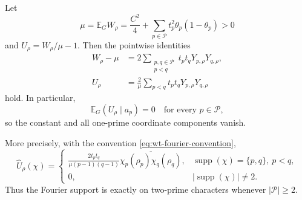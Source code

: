 \begin{theorem}
\label{thm:wt-pair-only-decomposition}
Let
\begin{equation}
 \mu=\mathbb E_G W_\rho
 =\frac{C^2}{4}
  +\sum_{p\in\mathcal P}t_p^2\theta_p(1-\theta_p)>0
 \label{eq:wt-mean-mu}
\end{equation}
and $U_\rho=W_\rho/\mu-1$.  Then the pointwise identities
\begin{align}
 W_\rho-\mu
&=2\sum_{\substack{p,q\in\mathcal P\\p<q}}
       t_pt_qY_{p,\rho}Y_{q,\rho},
 \label{eq:wt-exact-hoeffding}\\
 U_\rho
 &=\frac2\mu\sum_{p<q}t_pt_qY_{p,\rho}Y_{q,\rho}
 \label{eq:wt-normalized-hoeffding}
\end{align}
hold.  In particular,
\begin{equation}
 \mathbb E_G(U_\rho\mid a_p)=0
 \quad\text{for every }p\in\mathcal P,
 \label{eq:wt-one-coordinate-annihilation}
\end{equation}
so the constant and all one-prime coordinate components vanish.

More precisely, with the convention \eqref{eq:wt-fourier-convention},
\begin{equation}
 \widehat U_\rho(\chi)=
 \begin{cases}
 \displaystyle
 \frac{2t_pt_q}{\mu(p-1)(q-1)}
 \overline{\chi_p(\rho_p)\chi_q(\rho_q)},
 &\operatorname{supp}(\chi)=\{p,q\},\ p<q,\\[1.1em]
 0,&|\operatorname{supp}(\chi)|\ne2.
 \end{cases}
 \label{eq:wt-exact-fourier-support}
\end{equation}
Thus the Fourier support is exactly on two-prime characters whenever
$|\mathcal P|\ge2$.
\end{theorem}

